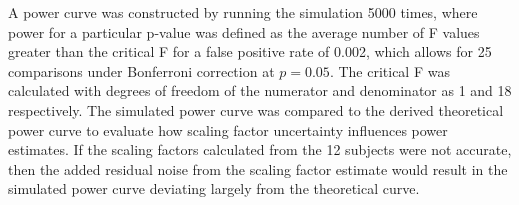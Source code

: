 A power curve was constructed by running the simulation 5000 times, where power for a particular p-value was defined as the average number of F values greater than the critical F for a false positive rate of 0.002, which allows for 25 comparisons under Bonferroni correction at $p=0.05$. The critical F was calculated with degrees of freedom of the numerator and denominator as 1 and 18 respectively. The simulated power curve was compared to the derived theoretical power curve to evaluate how scaling factor uncertainty influences power estimates. If the scaling factors calculated from the 12 subjects were not accurate, then the added residual noise from the scaling factor estimate would result in the simulated power curve deviating largely from the theoretical curve.